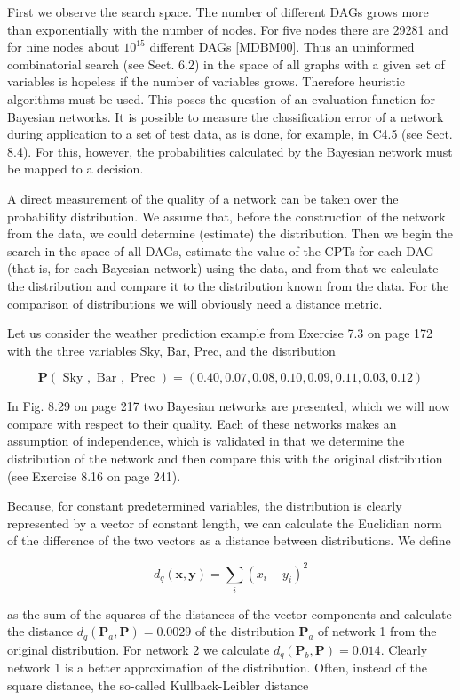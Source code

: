 \documentclass[10pt]{article}
\begin{document}
First we observe the search space. The number of different DAGs grows more than exponentially with the number of nodes. For five nodes there are 29281 and for nine nodes about $10^{15}$ different DAGs [MDBM00]. Thus an uninformed combinatorial search (see Sect. 6.2) in the space of all graphs with a given set of variables is hopeless if the number of variables grows. Therefore heuristic algorithms must be used. This poses the question of an evaluation function for Bayesian networks. It is possible to measure the classification error of a network during application to a set of test data, as is done, for example, in C4.5 (see Sect. 8.4). For this, however, the probabilities calculated by the Bayesian network must be mapped to a decision.

A direct measurement of the quality of a network can be taken over the probability distribution. We assume that, before the construction of the network from the data, we could determine (estimate) the distribution. Then we begin the search in the space of all DAGs, estimate the value of the CPTs for each DAG (that is, for each Bayesian network) using the data, and from that we calculate the distribution and compare it to the distribution known from the data. For the comparison of distributions we will obviously need a distance metric.

Let us consider the weather prediction example from Exercise 7.3 on page 172 with the three variables Sky, Bar, Prec, and the distribution

$$
\boldsymbol{P}(\text { Sky }, \text { Bar }, \text { Prec })=(0.40,0.07,0.08,0.10,0.09,0.11,0.03,0.12)
$$

In Fig. 8.29 on page 217 two Bayesian networks are presented, which we will now compare with respect to their quality. Each of these networks makes an assumption of independence, which is validated in that we determine the distribution of the network and then compare this with the original distribution (see Exercise 8.16 on page 241).

Because, for constant predetermined variables, the distribution is clearly represented by a vector of constant length, we can calculate the Euclidian norm of the difference of the two vectors as a distance between distributions. We define

$$
d_{q}(\boldsymbol{x}, \boldsymbol{y})=\sum_{i}\left(x_{i}-y_{i}\right)^{2}
$$

as the sum of the squares of the distances of the vector components and calculate the distance $d_{q}\left(\boldsymbol{P}_{a}, \boldsymbol{P}\right)=0.0029$ of the distribution $\boldsymbol{P}_{a}$ of network 1 from the original distribution. For network 2 we calculate $d_{q}\left(\boldsymbol{P}_{b}, \boldsymbol{P}\right)=0.014$. Clearly network 1 is a better approximation of the distribution. Often, instead of the square distance, the so-called Kullback-Leibler distance
\end{document}
